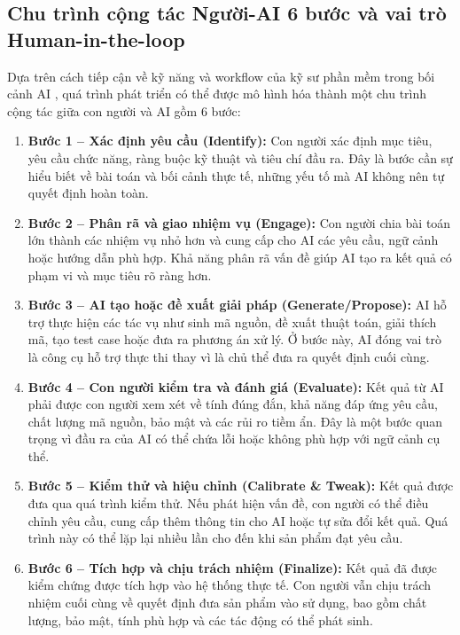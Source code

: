 \subsection{Chu trình cộng tác Người-AI 6 bước và vai trò Human-in-the-loop}

Dựa trên cách tiếp cận về kỹ năng và workflow của kỹ sư phần mềm trong bối cảnh AI \cite{kam2025what}, quá trình phát triển có thể được mô hình hóa thành một chu trình cộng tác giữa con người và AI gồm 6 bước:

\begin{enumerate}
    \item \textbf{Bước 1 -- Xác định yêu cầu (Identify):} Con người xác định mục tiêu, yêu cầu chức năng, ràng buộc kỹ thuật và tiêu chí đầu ra. Đây là bước cần sự hiểu biết về bài toán và bối cảnh thực tế, những yếu tố mà AI không nên tự quyết định hoàn toàn.
    \item \textbf{Bước 2 -- Phân rã và giao nhiệm vụ (Engage):} Con người chia bài toán lớn thành các nhiệm vụ nhỏ hơn và cung cấp cho AI các yêu cầu, ngữ cảnh hoặc hướng dẫn phù hợp. Khả năng phân rã vấn đề giúp AI tạo ra kết quả có phạm vi và mục tiêu rõ ràng hơn.
    \item \textbf{Bước 3 -- AI tạo hoặc đề xuất giải pháp (Generate/Propose):} AI hỗ trợ thực hiện các tác vụ như sinh mã nguồn, đề xuất thuật toán, giải thích mã, tạo test case hoặc đưa ra phương án xử lý. Ở bước này, AI đóng vai trò là công cụ hỗ trợ thực thi thay vì là chủ thể đưa ra quyết định cuối cùng.
    \item \textbf{Bước 4 -- Con người kiểm tra và đánh giá (Evaluate):} Kết quả từ AI phải được con người xem xét về tính đúng đắn, khả năng đáp ứng yêu cầu, chất lượng mã nguồn, bảo mật và các rủi ro tiềm ẩn. Đây là một bước quan trọng vì đầu ra của AI có thể chứa lỗi hoặc không phù hợp với ngữ cảnh cụ thể.
    \item \textbf{Bước 5 -- Kiểm thử và hiệu chỉnh (Calibrate \& Tweak):} Kết quả được đưa qua quá trình kiểm thử. Nếu phát hiện vấn đề, con người có thể điều chỉnh yêu cầu, cung cấp thêm thông tin cho AI hoặc tự sửa đổi kết quả. Quá trình này có thể lặp lại nhiều lần cho đến khi sản phẩm đạt yêu cầu.
    \item \textbf{Bước 6 -- Tích hợp và chịu trách nhiệm (Finalize):} Kết quả đã được kiểm chứng được tích hợp vào hệ thống thực tế. Con người vẫn chịu trách nhiệm cuối cùng về quyết định đưa sản phẩm vào sử dụng, bao gồm chất lượng, bảo mật, tính phù hợp và các tác động có thể phát sinh.
\end{enumerate}


